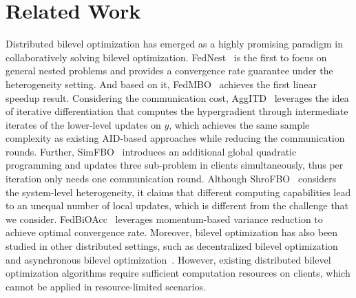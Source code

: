 \documentclass[lettersize,journal]{IEEEtran}
\begin{document}
\section{Related Work}
Distributed bilevel optimization has emerged as a highly promising paradigm in collaboratively solving bilevel optimization. FedNest~\cite{conf/icml/fednest} is the first to focus on general nested problems and provides a convergence rate guarantee under the heterogeneity setting. And based on it, FedMBO~\cite{conf/icml/fedmbo} achieves the first linear speedup result. Considering the communication cost, AggITD~\cite{xiao2023communication} leverages the idea of iterative differentiation that computes the hypergradient through intermediate iterates of the lower-level updates on $y$, which achieves the same sample complexity as existing AID-based approaches while reducing the communication rounds. Further, SimFBO~\cite{yang2024simfbo} introduces an additional global quadratic programming and updates three sub-problem in clients simultaneously, thus per iteration only needs one communication round. Although ShroFBO~\cite{yang2024simfbo} considers the system-level heterogeneity, it claims that different computing capabilities lead to an unequal number of
local updates, which is different from the challenge that we consider. FedBiOAcc~\cite{li2024communication} leverages momentum-based variance reduction to achieve optimal convergence rate. Moreover, bilevel optimization has also been studied in other distributed settings, such as decentralized bilevel optimization~\cite{chen2023decentralized} and asynchronous bilevel optimization~\cite{jiaoasynchronous}.
However, existing distributed bilevel optimization algorithms require sufficient computation resources on clients, which cannot be applied in resource-limited scenarios.
\end{document}
